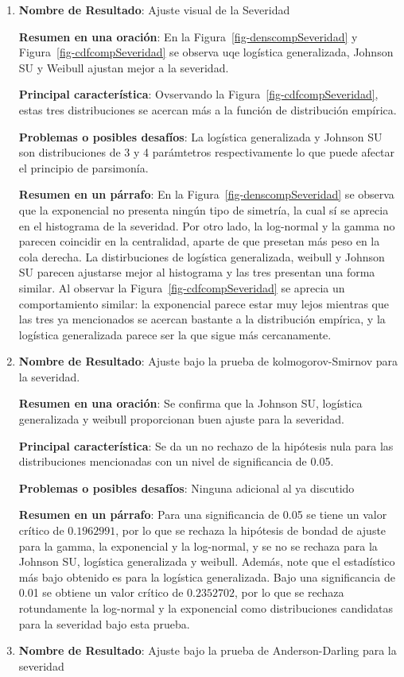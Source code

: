 \documentclass[
  letterpaper,
  onepage,
  openany]{scrreprt}
\begin{document}
\begin{enumerate}
\def\labelenumi{\arabic{enumi}.}
\item
  \textbf{Nombre de Resultado}: Ajuste visual de la Severidad

  \textbf{Resumen en una oración}: En la
  Figura~\ref{fig-denscompSeveridad} y Figura~\ref{fig-cdfcompSeveridad}
  se observa uqe logística generalizada, Johnson SU y Weibull ajustan
  mejor a la severidad.

  \textbf{Principal característica}: Ovservando la
  Figura~\ref{fig-cdfcompSeveridad}, estas tres distribuciones se
  acercan más a la función de distribución empírica.

  \textbf{Problemas o posibles desafíos}: La logística generalizada y
  Johnson SU son distribuciones de 3 y 4 parámtetros respectivamente lo
  que puede afectar el principio de parsimonía.

  \textbf{Resumen en un párrafo}: En la
  Figura~\ref{fig-denscompSeveridad} se observa que la exponencial no
  presenta ningún tipo de simetría, la cual sí se aprecia en el
  histograma de la severidad. Por otro lado, la log-normal y la gamma no
  parecen coincidir en la centralidad, aparte de que presetan más peso
  en la cola derecha. La distirbuciones de logística generalizada,
  weibull y Johnson SU parecen ajustarse mejor al histograma y las tres
  presentan una forma similar. Al observar la
  Figura~\ref{fig-cdfcompSeveridad} se aprecia un comportamiento
  similar: la exponencial parece estar muy lejos mientras que las tres
  ya mencionados se acercan bastante a la distribución empírica, y la
  logística generalizada parece ser la que sigue más cercanamente.
\item
  \textbf{Nombre de Resultado}: Ajuste bajo la prueba de
  kolmogorov-Smirnov para la severidad.

  \textbf{Resumen en una oración}: Se confirma que la Johnson SU,
  logística generalizada y weibull proporcionan buen ajuste para la
  severidad.

  \textbf{Principal característica}: Se da un no rechazo de la hipótesis
  nula para las distribuciones mencionadas con un nivel de significancia
  de 0.05.

  \textbf{Problemas o posibles desafíos}: Ninguna adicional al ya
  discutido

  \textbf{Resumen en un párrafo}: Para una significancia de 0.05 se
  tiene un valor crítico de \(0.1962991\), por lo que se rechaza la
  hipótesis de bondad de ajuste para la gamma, la exponencial y la
  log-normal, y se no se rechaza para la Johnson SU, logística
  generalizada y weibull. Además, note que el estadístico más bajo
  obtenido es para la logística generalizada. Bajo una significancia de
  0.01 se obtiene un valor crítico de \(0.2352702\), por lo que se
  rechaza rotundamente la log-normal y la exponencial como
  distribuciones candidatas para la severidad bajo esta prueba.
\item
  \textbf{Nombre de Resultado}: Ajuste bajo la prueba de
  Anderson-Darling para la severidad


\end{enumerate}
\end{document}
